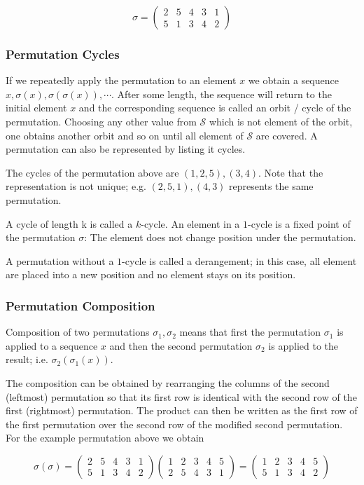 \[
\sigma=
\begin{pmatrix}
2 & 5 & 4 & 3 & 1 \\
5 & 1 & 3 & 4 & 2
\end{pmatrix}
\]

\subsubsection{Permutation Cycles}

If we repeatedly apply the permutation to an element \(x\) we obtain a
sequence \(x, \sigma(x), \sigma(\sigma(x)), \cdots\). After some length,
the sequence will return to the initial element \(x\) and the
corresponding sequence is called an orbit / cycle of the permutation.
Choosing any other value from \(\mathcal{S}\) which is not element of
the orbit, one obtains another orbit and so on until all element of
\(\mathcal{S}\) are covered. A permutation can also be represented by
listing it cycles.

The cycles of the permutation above are \((1,2,5), (3,4)\). Note that
the representation is not unique; e.g. \((2,5,1), (4,3)\) represents the
same permutation.

A cycle of length k is called a \(k\)-cycle. An element in a \(1\)-cycle
is a fixed point of the permutation \(\sigma\): The element does not
change position under the permutation.

A permutation without a \(1\)-cycle is called a derangement; in this
case, all element are placed into a new position and no element stays on
its position.

\subsubsection{Permutation Composition}

Composition of two permutations \(\sigma_1, \sigma_2\) means that first
the permutation \(\sigma_1\) is applied to a sequence \(x\) and then the
second permutation \(\sigma_2\) is applied to the result; i.e.
\(\sigma_2(\sigma_1(x))\).

The composition can be obtained by rearranging the columns of the second
(leftmost) permutation so that its first row is identical with the
second row of the first (rightmost) permutation. The product can then be
written as the first row of the first permutation over the second row of
the modified second permutation. For the example permutation above we
obtain

\[
\sigma(\sigma) = 
\begin{pmatrix}
2 & 5 & 4 & 3 & 1 \\
5 & 1 & 3 & 4 & 2
\end{pmatrix}
\begin{pmatrix}
1 & 2 & 3 & 4 & 5 \\
2 & 5 & 4 & 3 & 1
\end{pmatrix}
=
\begin{pmatrix}
1 & 2 & 3 & 4 & 5 \\
5 & 1 & 3 & 4 & 2
\end{pmatrix}
\]

